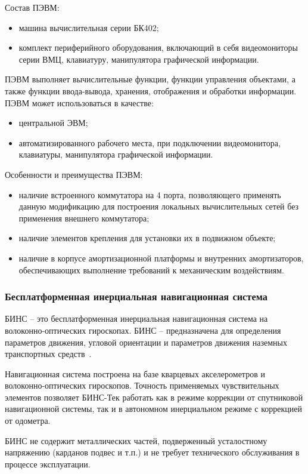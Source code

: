 Состав ПЭВМ:
\begin{itemize}
	\item машина вычислительная серии БК402;
	\item комплект периферийного оборудования, включающий в себя видеомониторы серии ВМЦ, клавиатуру, манипулятора графической информации.
\end{itemize}

ПЭВМ выполняет вычислительные функции, функции управления объектами, а также функции ввода-вывода, хранения, отображения и обработки информации.
ПЭВМ может  использоваться в  качестве:
\begin{itemize}
	\item центральной ЭВМ;
	\item автоматизированного рабочего места, при подключении видеомонитора, клавиатуры, манипулятора графической информации.
\end{itemize}

Особенности и преимущества ПЭВМ:
\begin{itemize}
	\item наличие встроенного коммутатора на 4 порта, позволяющего применять данную модификацию для построения
		локальных вычислительных сетей без применения внешнего коммутатора;
	\item наличие элементов крепления для установки их в подвижном объекте;
	\item наличие в корпусе амортизационной платформы и внутренних амортизаторов, обеспечивающих  выполнение требований к механическим воздействиям.
\end{itemize}

\subsubsection{Бесплатформенная инерциальная навигационная система}
\label{sub:lit_review:ins:bins}
БИНС -- это бесплатформенная инерциальная навигационная система на волоконно-оптических гироскопах.
БИНС -- предназначена для определения параметров движения, угловой ориентации и параметров движения наземных
транспортных средств~\cite{bins}.

Навигационная система построена на базе кварцевых акселерометров и волоконно-оптических гироскопов. Точность применяемых чувствительных элементов позволяет БИНС-Тек работать как в режиме коррекции от спутниковой навигационной системы, так и в автономном инерциальном режиме с коррекцией от одометра.

БИНС не содержит металлических частей, подверженный усталостному напряжению (карданов подвес и т.п.) и не требует технического обслуживания в процессе эксплуатации.


